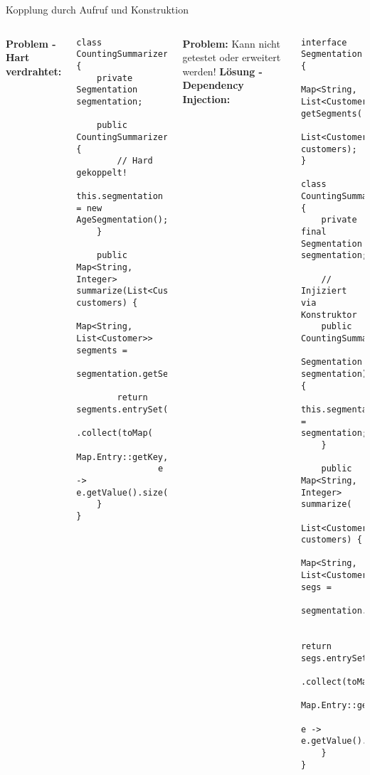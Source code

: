 \begin{frame}[fragile]{Kopplung durch Aufruf und Konstruktion}
  \begin{columns}[T]
    \textbf{Problem - Hart verdrahtet:}
    \begin{lstlisting}[style=java, basicstyle=\tiny\ttfamily]
class CountingSummarizer {
    private Segmentation segmentation;

    public CountingSummarizer() {
        // Hard gekoppelt!
        this.segmentation = new AgeSegmentation();
    }

    public Map<String, Integer> summarize(List<Customer> customers) {
        Map<String, List<Customer>> segments =
            segmentation.getSegments(customers);

        return segments.entrySet().stream()
            .collect(toMap(
                Map.Entry::getKey,
                e -> e.getValue().size()));
    }
}
    \end{lstlisting}
    \textbf{Problem:} Kann nicht getestet oder erweitert werden!
    \textbf{Lösung - Dependency Injection:}
    \begin{lstlisting}[style=java, basicstyle=\tiny\ttfamily]
interface Segmentation {
    Map<String, List<Customer>> getSegments(
        List<Customer> customers);
}

class CountingSummarizer {
    private final Segmentation segmentation;

    // Injiziert via Konstruktor
    public CountingSummarizer(
            Segmentation segmentation) {
        this.segmentation = segmentation;
    }

    public Map<String, Integer> summarize(
            List<Customer> customers) {
        Map<String, List<Customer>> segs =
            segmentation.getSegments(customers);

        return segs.entrySet().stream()
            .collect(toMap(
                Map.Entry::getKey,
                e -> e.getValue().size()));
    }
}
    \end{lstlisting}
  \end{columns}
\end{frame}

